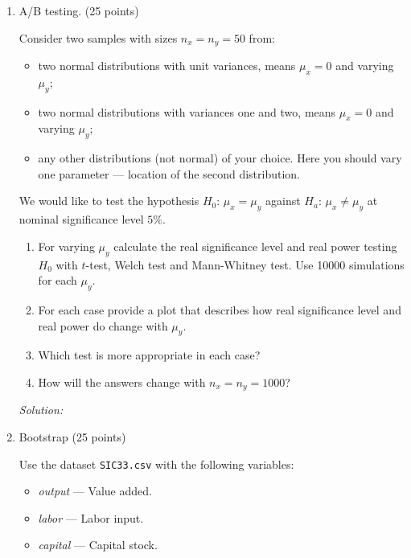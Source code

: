 \documentclass[12pt]{article}
\newcommand{\1}{\mathbbm{I}}
\begin{document}
	

\begin{enumerate}


\item  A/B testing. (25 points)

Consider two samples with sizes $n_x = n_y=50$ from:
\begin{itemize}
	\item two normal distributions with unit variances, means $\mu_x = 0$ and varying $\mu_y$;
	\item two normal distributions with variances one and two, means $\mu_x = 0$ and varying $\mu_y$;
	\item any other distributions (not normal) of your choice. 
	Here you should vary one parameter — location of the second distribution.
\end{itemize}

We would like to test the hypothesis $H_0$: $\mu_x = \mu_y$ against $H_a$: $\mu_x \neq \mu_y$ at nominal significance level $5\%$.
\begin{enumerate}
	\item For varying $\mu_y$ calculate the real significance level and real power 
	testing $H_0$ with $t$-test, Welch test and Mann-Whitney test. 
	Use 10000 simulations for each $\mu_y$. 
	\item For each case provide a plot that describes how 
	real significance level and real power do change with $\mu_y$.
	\item Which test is more appropriate in each case?
	\item How will the answers change with $n_x = n_y =1000$?
	
\end{enumerate}

\begin{teacher}
	
\textit{Solution:} 

	
\end{teacher}





\item Bootstrap (25 points)


Use the dataset \texttt{SIC33.csv} with the following variables:
\begin{itemize}
	\item \textit{output} — Value added.
	\item  \textit{labor} — Labor input.
	\item  \textit{capital} — Capital stock.
\end{itemize}


\end{enumerate}
\end{document}
